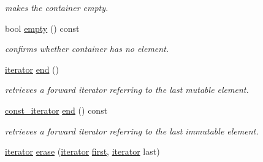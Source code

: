 \begin{DoxyCompactItemize}
\begin{DoxyCompactList}\small\item\em makes the container empty. \end{DoxyCompactList}\item 
\hypertarget{classhryky_1_1_fixed_vector_ae50f56db3954b910239ba68b7f296e3d}{bool \hyperlink{classhryky_1_1_fixed_vector_ae50f56db3954b910239ba68b7f296e3d}{empty} () const }\label{classhryky_1_1_fixed_vector_ae50f56db3954b910239ba68b7f296e3d}

\begin{DoxyCompactList}\small\item\em confirms whether container has no element. \end{DoxyCompactList}\item 
\hypertarget{classhryky_1_1_fixed_vector_a7e78bde51c918d8032e3d835f43713fc}{\hyperlink{classhryky_1_1iterator_1_1random_1_1_mutable}{iterator} \hyperlink{classhryky_1_1_fixed_vector_a7e78bde51c918d8032e3d835f43713fc}{end} ()}\label{classhryky_1_1_fixed_vector_a7e78bde51c918d8032e3d835f43713fc}

\begin{DoxyCompactList}\small\item\em retrieves a forward iterator referring to the last mutable element. \end{DoxyCompactList}\item 
\hypertarget{classhryky_1_1_fixed_vector_ab296636b3b2c466f3f3a8a38178a1491}{\hyperlink{classhryky_1_1iterator_1_1random_1_1_immutable}{const\-\_\-iterator} \hyperlink{classhryky_1_1_fixed_vector_ab296636b3b2c466f3f3a8a38178a1491}{end} () const }\label{classhryky_1_1_fixed_vector_ab296636b3b2c466f3f3a8a38178a1491}

\begin{DoxyCompactList}\small\item\em retrieves a forward iterator referring to the last immutable element. \end{DoxyCompactList}\item 
\hypertarget{classhryky_1_1_fixed_vector_a01e15b899a3d8372b38caeb04a54ceb2}{\hyperlink{classhryky_1_1iterator_1_1random_1_1_mutable}{iterator} \hyperlink{classhryky_1_1_fixed_vector_a01e15b899a3d8372b38caeb04a54ceb2}{erase} (\hyperlink{classhryky_1_1iterator_1_1random_1_1_mutable}{iterator} \hyperlink{classhryky_1_1_fixed_vector_a1133d189d2a155830e739d20450e1b40}{first}, \hyperlink{classhryky_1_1iterator_1_1random_1_1_mutable}{iterator} last)}\label{classhryky_1_1_fixed_vector_a01e15b899a3d8372b38caeb04a54ceb2}


\end{DoxyCompactItemize}
